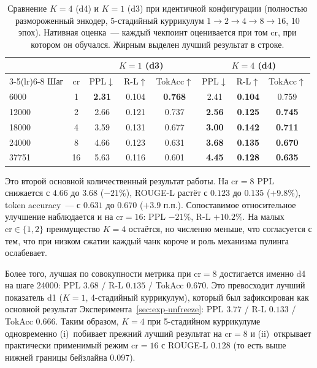 \documentclass[a4paper,12pt]{extarticle}
\begin{document}
\begin{table}[ht]
\centering
\caption{Сравнение $K=4$ (d4) и $K=1$ (d3) при идентичной конфигурации (полностью размороженный энкодер, 5-стадийный куррикулум $1 \to 2 \to 4 \to 8 \to 16$, 10 эпох). Нативная оценка~--- каждый чекпоинт оценивается при том $\text{cr}$, при котором он обучался. Жирным выделен лучший результат в строке.}
\label{tab:exp-multilatent}
\footnotesize
\begin{tabular}{lccccccc}
\toprule
& & \multicolumn{3}{c}{$K=1$ (d3)} & \multicolumn{3}{c}{$K=4$ (d4)} \\
\cmidrule(lr){3-5}\cmidrule(lr){6-8}
Шаг & cr & PPL$\downarrow$ & R-L$\uparrow$ & TokAcc$\uparrow$ & PPL$\downarrow$ & R-L$\uparrow$ & TokAcc$\uparrow$ \\
\midrule
6000  & 1   & \textbf{2.31} & 0.104          & \textbf{0.768} & 2.41          & \textbf{0.104} & 0.759 \\
12000 & 2   & 2.66          & 0.121          & 0.737          & \textbf{2.56} & \textbf{0.125} & \textbf{0.745} \\
18000 & 4   & 3.59          & 0.131          & 0.677          & \textbf{3.00} & \textbf{0.142} & \textbf{0.711} \\
24000 & 8   & 4.66          & 0.123          & 0.631          & \textbf{3.68} & \textbf{0.135} & \textbf{0.670} \\
37751 & 16  & 5.63          & 0.116          & 0.601          & \textbf{4.45} & \textbf{0.128} & \textbf{0.635} \\
\bottomrule
\end{tabular}
\end{table}

Это второй основной количественный результат работы. На $\text{cr}=8$ PPL снижается с $4.66$ до $3.68$ ($-21\%$), ROUGE-L растёт с $0.123$ до $0.135$ ($+9.8\%$), token accuracy~--- с $0.631$ до $0.670$ ($+3.9$ п.п.). Сопоставимое относительное улучшение наблюдается и на $\text{cr}=16$: PPL $-21\%$, R-L $+10.2\%$. На малых $\text{cr} \in \{1, 2\}$ преимущество $K=4$ остаётся, но численно меньше, что согласуется с тем, что при низком сжатии каждый чанк короче и роль механизма пулинга ослабевает.

Более того, лучшая по совокупности метрика при $\text{cr}=8$ достигается именно d4 на шаге 24000: PPL $3.68$ / R-L $0.135$ / TokAcc $0.670$. Это превосходит лучший показатель d1 ($K=1$, 4-стадийный куррикулум), который был зафиксирован как основной результат Эксперимента~\ref{sec:exp-unfreeze}: PPL $3.77$ / R-L $0.133$ / TokAcc $0.666$. Таким образом, $K=4$ при 5-стадийном куррикулуме одновременно (i)~побивает прежний лучший результат на $\text{cr}=8$ и (ii)~открывает практически применимый режим $\text{cr}=16$ с ROUGE-L $0.128$ (то есть выше нижней границы бейзлайна $0.097$).
\end{document}

